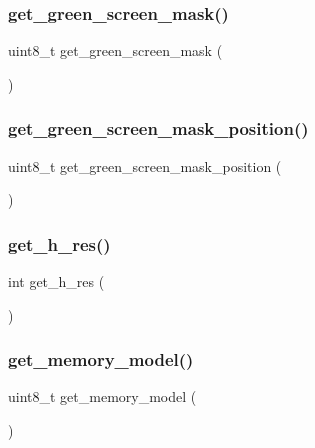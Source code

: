 \mbox{\label{group__video_ga0f0db7b6e31ed06140761c77d5b338ab}} 
\subsubsection{\texorpdfstring{get\_green\_screen\_mask()}{get\_green\_screen\_mask()}}
{\footnotesize\ttfamily uint8\+\_\+t get\+\_\+green\+\_\+screen\+\_\+mask (\begin{DoxyParamCaption}{ }\end{DoxyParamCaption})}

\mbox{\label{group__video_ga6212cfb721ba6c38f52de83d57788d69}} 
\subsubsection{\texorpdfstring{get\_green\_screen\_mask\_position()}{get\_green\_screen\_mask\_position()}}
{\footnotesize\ttfamily uint8\+\_\+t get\+\_\+green\+\_\+screen\+\_\+mask\+\_\+position (\begin{DoxyParamCaption}{ }\end{DoxyParamCaption})}

\mbox{\label{group__video_ga3456b8539e4326dd13cbfc4f81b609f1}} 
\subsubsection{\texorpdfstring{get\_h\_res()}{get\_h\_res()}}
{\footnotesize\ttfamily int get\+\_\+h\+\_\+res (\begin{DoxyParamCaption}{ }\end{DoxyParamCaption})}

\mbox{\label{group__video_gaee3838c12a8543f378920ab8f6c3cae2}} 
\subsubsection{\texorpdfstring{get\_memory\_model()}{get\_memory\_model()}}
{\footnotesize\ttfamily uint8\+\_\+t get\+\_\+memory\+\_\+model (\begin{DoxyParamCaption}{ }\end{DoxyParamCaption})}

